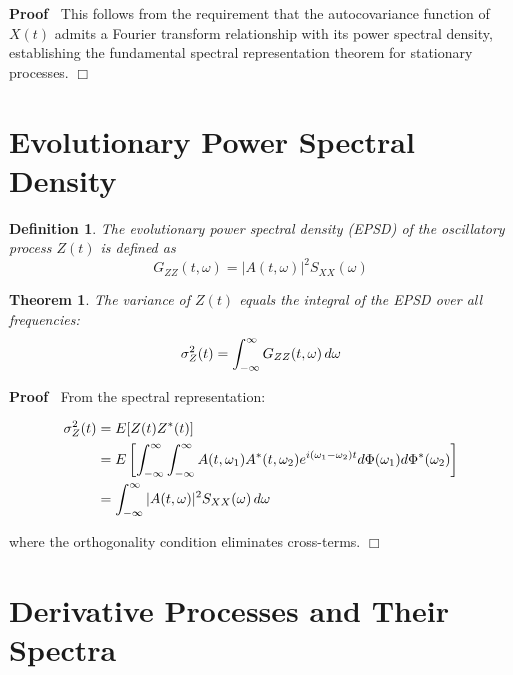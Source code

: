 \documentclass{article}
\newenvironment{proof}{\noindent\textbf{Proof\ }}{\hspace*{\fill}$\Box$\medskip}
\newtheorem{definition}{Definition}
\newtheorem{theorem}{Theorem}
\begin{document}
\begin{proof}
  This follows from the requirement that the autocovariance function of $X
  (t)$ admits a Fourier transform relationship with its power spectral
  density, establishing the fundamental spectral representation theorem for
  stationary processes.
\end{proof}

\section{Evolutionary Power Spectral Density}

\begin{definition}
  The evolutionary power spectral density (EPSD) of the oscillatory process $Z
  (t)$ is defined as
  \begin{equation}
    G_{ZZ} (t, \omega) = |A (t, \omega) |^2 S_{XX} (\omega)
  \end{equation}
\end{definition}

\begin{theorem}
  The variance of $Z (t)$ equals the integral of the EPSD over all
  frequencies:
  \begin{equation}
    \sigma_Z^2 (t) = \int_{- \infty}^{\infty} G_{ZZ} (t, \omega) 
    \hspace{0.17em} d \omega
  \end{equation}
\end{theorem}

\begin{proof}
  From the spectral representation:
  
  \begin{align}
    \sigma_Z^2 (t) & = E [Z (t) Z^{\ast} (t)] \\
    & = E \left[ \int_{- \infty}^{\infty} \int_{- \infty}^{\infty} A (t,
    \omega_1) A^{\ast} (t, \omega_2) e^{i (\omega_1 - \omega_2) t} d \Phi
    (\omega_1) d \Phi^{\ast} (\omega_2) \right] \\
    & = \int_{- \infty}^{\infty} |A (t, \omega) |^2 S_{XX} (\omega) 
    \hspace{0.17em} d \omega 
  \end{align}
  
  where the orthogonality condition eliminates cross-terms.
\end{proof}

\section{Derivative Processes and Their Spectra}
\end{document}
